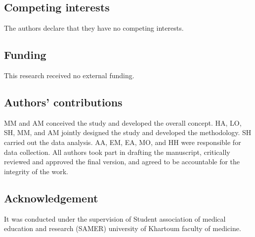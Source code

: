 \documentclass[12pt]{article}
\begin{document}
\subsection*{Competing interests}
The authors declare that they have no competing interests.

\subsection*{Funding}
This research received no external funding.

\subsection*{Authors' contributions}
MM and AM conceived the study and developed the overall concept. HA, LO, SH, MM, and AM jointly designed the study and developed the methodology. SH carried out the data analysis. AA, EM, EA, MO, and HH were responsible for data collection. All authors took part in drafting the manuscript, critically reviewed and approved the final version, and agreed to be accountable for the integrity of the work.

\subsection*{Acknowledgement}
It was conducted under the supervision of Student association of medical education and research (SAMER) university of Khartoum faculty of medicine.




\nocite{*}


\end{document}
